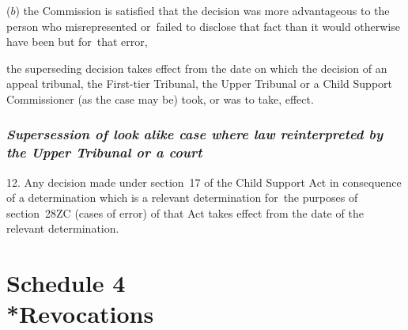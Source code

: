 \documentclass[12pt,a4paper]{article}
\begin{document}
{\begin{enumerate}
($b$) the Commission is satisfied that the decision was more advantageous to the person who misrepresented or~failed to disclose that fact than it would otherwise have been but for~that error,
\end{enumerate}
the superseding decision takes effect from the date on which the decision of 
an appeal tribunal, the First-tier Tribunal, the Upper Tribunal or a Child Support Commissioner (as the case may be)  %
took, or was to take, effect.


\section*{\itshape\sloppy{} Supersession of look alike case where law reinterpreted by the Upper Tribunal or a court}

12.  Any decision made under section~17 of the Child Support Act in consequence of a determination which is a relevant determination for~the purposes of section~28ZC (cases of error) of that Act takes effect from the date of the relevant determination.

}

\part[Schedule 4 --- Revocations]{Schedule 4\\*Revocations}

\renewcommand\parthead{--- Schedule 4}
\end{document}

